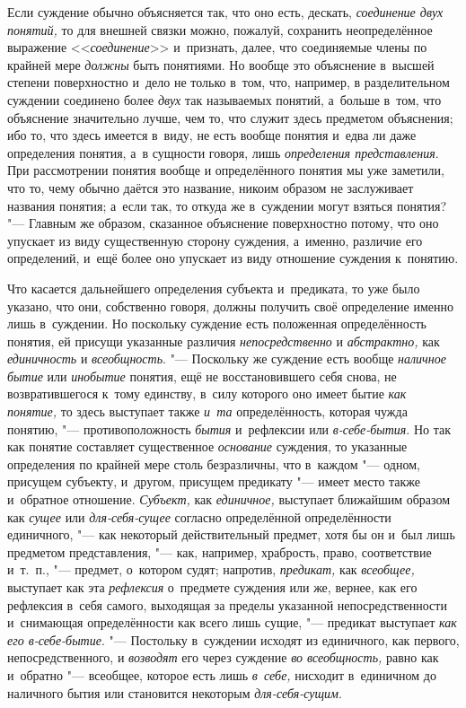 Если суждение обычно объясняется так, что оно есть, дескать,
{\em соединение двух понятий,} то для внешней связки можно, пожалуй, сохранить
неопределённое выражение <<{\em соединение}>> и~признать, далее, что
соединяемые члены по крайней мере {\em должны} быть понятиями. Но вообще это
объяснение в~высшей степени поверхностно и~дело не только в~том, что, например,
в разделительном суждении соединено более {\em двух} так называемых
понятий, а~больше в~том, что объяснение значительно лучше, чем то, что
служит здесь предметом объяснения; ибо то, что здесь имеется в~виду, не
есть вообще понятия и~едва ли даже определения понятия, а~в сущности говоря,
лишь {\em определения представления}. При рассмотрении понятия вообще и
определённого понятия мы уже заметили, что то, чему обычно даётся это
название, никоим образом не заслуживает названия понятия; а~если так, то
откуда же в~суждении могут взяться понятия? "--- Главным же
образом, сказанное объяснение поверхностно потому, что оно упускает из виду
существенную сторону суждения, а~именно, различие его определений, и~ещё
более оно упускает из виду отношение суждения к~понятию.

Что касается дальнейшего определения субъекта и~предиката, то
уже было указано, что они, собственно говоря, должны получить своё
определение именно лишь в~суждении. Но поскольку суждение есть положенная
определённость понятия, ей присущи указанные различия
{\em непосредственно} и {\em абстрактно,} как {\em единичность}
и {\em всеобщность}. "--- Поскольку же суждение есть вообще
{\em наличное бытие} или {\em инобытие} понятия, ещё не восстановившего себя
снова, не возвратившегося к~тому единству, в~силу которого оно имеет бытие
{\em как понятие,} то здесь выступает также {\em и~та} определённость, которая
чужда понятию, "--- противоположность {\em бытия} и~рефлексии или
{\em в-себе-бытия}. Но так как понятие составляет существенное {\em основание}
суждения, то указанные определения по крайней мере столь безразличны, что
в~каждом "--- одном, присущем субъекту, и~другом, присущем предикату "---
имеет место также и~обратное отношение. {\em Субъект,} как {\em единичное,}
выступает ближайшим образом как {\em сущее} или {\em для-себя-сущее}
согласно определённой определённости единичного, "---
как некоторый действительный предмет, хотя бы он и~был лишь
предметом представления, "--- как, например, храбрость, право,
соответствие и~т.~п., "--- предмет, о~котором судят; напротив,
{\em предикат,} как {\em всеобщее,} выступает как эта {\em рефлексия}
о~предмете суждения или же, вернее, как его рефлексия в~себя самого,
выходящая за пределы указанной непосредственности и~снимающая определённости
как всего лишь сущие, "--- предикат выступает {\em как его в-себе-бытие}. "---
Постольку в~суждении исходят из единичного, как первого, непосредственного, и
{\em возводят} его через суждение {\em во всеобщность,} равно как и~обратно
"--- всеобщее, которое есть лишь {\em в~себе,} нисходит в~единичном до
наличного бытия или становится некоторым {\em для-себя-сущим}.

